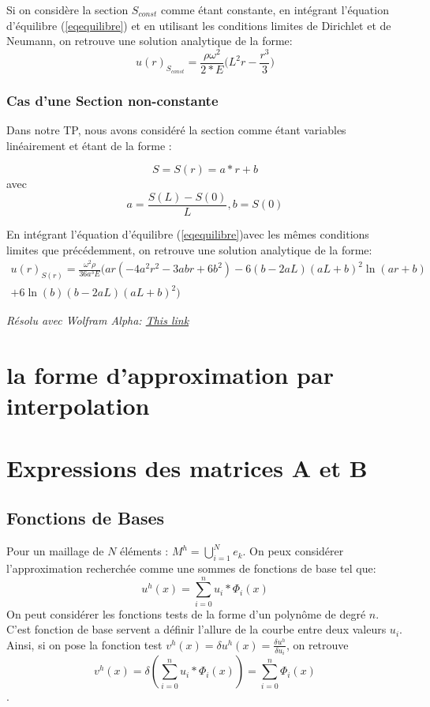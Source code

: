 \documentclass[a4paper,10pt]{report} %
\begin{document}
Si on considère la section $S_{const}$ comme étant constante, en intégrant l'équation d'équilibre (\ref{eqequilibre}) et en utilisant les conditions limites de Dirichlet et de Neumann, on retrouve une solution analytique de la forme:
\begin{equation}
	u(r)_{S_{const}}=\frac{\rho \omega^2}{2*E}\big(L^2 r-\frac{r^3}{3}\big)
	\label{solsconst}
\end{equation}

\subsubsection{Cas d'une Section non-constante}

Dans notre TP, nous avons considéré la section comme étant variables linéairement et étant de la forme :

$$S=S(r)=a*r+b$$
avec
$$a=\frac{S(L)-S(0)}{L},b=S(0)$$ 

En intégrant l'équation d'équilibre (\ref{eqequilibre})avec les mêmes conditions limites que précédemment, on retrouve une solution analytique de la forme:
\begin{multline}
	u(r)_{S(r)}=\frac{\omega^2 \rho}{36a^3E}\Big( ar(-4a^2r^2-3abr+6b^2)-6(b-2aL)(aL+b)^2\ln(ar+b)\\+6\ln(b)(b-2aL)(aL+b)^2 \Big)
	\label{solution u}
\end{multline}

\textit{Résolu avec Wolfram Alpha\textregistered : \href{https://goo.gl/IB3dHC}{This link}}

\section{la forme d'approximation par interpolation}
\section{Expressions des matrices A et B }
\subsection{Fonctions de Bases}
Pour un maillage de $N$ éléments : $M^h=\bigcup_{i=1}^{N} e_k$. On peux considérer l'approximation recherchée comme une sommes de fonctions de base tel que:
\begin{equation}
	u^h(x)=\sum_{i=0}^n u_{i}*\Phi_{i}(x)
	\label{discretisation de u}
\end{equation}
On peut considérer les fonctions tests de la forme d'un polynôme de degré $n$. C'est fonction de base servent a définir l'allure de la courbe entre deux valeurs $u_{i}$.
Ainsi, si on pose la fonction test $v^h(x)=\delta u^h(x)=\frac{\delta u^h}{\delta u_i}$, on retrouve
$$v^h(x)=\delta (\sum_{i=0}^n u_{i}*\Phi_{i}(x))=\sum_{i=0}^n \Phi_{i}(x)$$.
\end{document}
